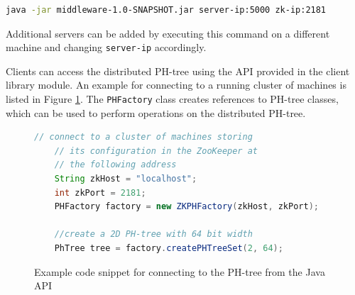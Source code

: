 \documentclass[11pt,a4paper]{globis-book}
\begin{document}
\begin{lstlisting}[language=BASH]
    java -jar middleware-1.0-SNAPSHOT.jar server-ip:5000 zk-ip:2181
\end{lstlisting}

Additional servers can be added by executing this command on a different machine and changing \texttt{server-ip} accordingly. 

Clients can access the distributed PH-tree using the API provided in the client library module. An example for connecting to a running cluster of machines is listed in Figure \ref{fig:java-code}. The \texttt{PHFactory} class creates references to PH-tree classes, which can be used to perform operations on the distributed PH-tree.

\begin{figure}
\begin{lstlisting}[language=Java]       
    // connect to a cluster of machines storing 
    // its configuration in the ZooKeeper at 
    // the following address 
    String zkHost = "localhost";
    int zkPort = 2181;
    PHFactory factory = new ZKPHFactory(zkHost, zkPort);

    //create a 2D PH-tree with 64 bit width
    PhTree tree = factory.createPHTreeSet(2, 64);    
\end{lstlisting}
\caption{Example code snippet for connecting to the PH-tree from the Java API}
\label{fig:java-code}
\end{figure}
\listoffigures

\newpage
\thispagestyle{empty}





\end{document}
